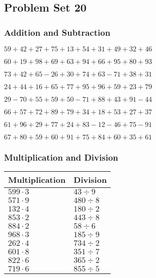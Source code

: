 \hypertarget{problem-set-20}{%
\subsection{Problem Set 20}\label{problem-set-20}}

\hypertarget{addition-and-subtraction}{%
\subsubsection{Addition and
Subtraction}\label{addition-and-subtraction}}

\(59+42+27+75+13+54+31+49+32+46\)

\(60+19+98+69+63+94+66+95+80+93\)

\(73+42+65-26+30+74+63-71+38+31\)

\(24+44+16+65+77+95+96+59+23+79\)

\(29-70+55+59+50-71+88+43+91-44\)

\(66+57+72+89+79+34+18+53+27+37\)

\(61+96+29+77+24+83-12-46+75-91\)

\(67+80+59+60+91+75+84+60+35+61\)

\hypertarget{multiplication-and-division}{%
\subsubsection{Multiplication and
Division}\label{multiplication-and-division}}

\begin{longtable}[]{@{}ll@{}}
\toprule
Multiplication & Division\tabularnewline
\midrule
\endhead
\(599\cdot3\) & \(43÷9\)\tabularnewline
\(571\cdot9\) & \(480÷8\)\tabularnewline
\(132\cdot4\) & \(180÷2\)\tabularnewline
\(853\cdot2\) & \(443÷8\)\tabularnewline
\(884\cdot2\) & \(58÷6\)\tabularnewline
\(968\cdot3\) & \(185÷9\)\tabularnewline
\(262\cdot4\) & \(734÷2\)\tabularnewline
\(601\cdot8\) & \(351÷7\)\tabularnewline
\(822\cdot6\) & \(365÷2\)\tabularnewline
\(719\cdot6\) & \(855÷5\)\tabularnewline
\bottomrule
\end{longtable}
